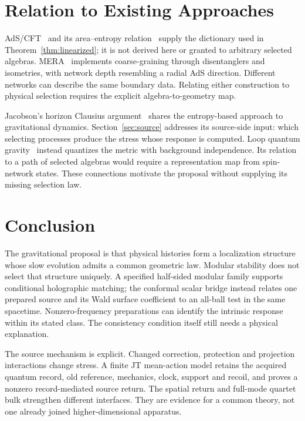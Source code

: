 \section{Relation to Existing Approaches}
\label{sec:relation}

AdS/CFT~\cite{Maldacena1999} and its area--entropy relation~\cite{RyuTakayanagi2006} supply the dictionary used in Theorem~\ref{thm:linearized}; it is not derived here or granted to arbitrary selected algebras. MERA~\cite{Vidal2008,Swingle2012} implements coarse-graining through disentanglers and isometries, with network depth resembling a radial AdS direction. Different networks can describe the same boundary data. Relating either construction to physical selection requires the explicit algebra-to-geometry map.

Jacobson's horizon Clausius argument~\cite{Jacobson1995} shares the entropy-based approach to gravitational dynamics. Section~\ref{sec:source} addresses its source-side input: which selecting processes produce the stress whose response is computed. Loop quantum gravity~\cite{Rovelli2004,Thiemann2007} instead quantizes the metric with background independence. Its relation to a path of selected algebras would require a representation map from spin-network states. These connections motivate the proposal without supplying its missing selection law.

\section{Conclusion}
\label{sec:conclusion}

The gravitational proposal is that physical histories form a localization
structure whose slow evolution admits a common geometric law.
Modular stability does not select that structure uniquely.
A specified half-sided modular family supports conditional holographic
matching; the conformal scalar bridge instead relates one prepared
source and its Wald surface coefficient to an all-ball test in the
same spacetime. Nonzero-frequency preparations can identify the
intrinsic response within its stated class. The consistency condition
itself still needs a physical explanation.

The source mechanism is explicit. Changed correction, protection and
projection interactions change stress. A finite JT mean-action model
retains the acquired quantum record, old reference, mechanics, clock,
support and recoil, and proves a nonzero record-mediated source return.
The spatial return and full-mode quartet bulk strengthen different
interfaces. They are evidence for a common theory, not one already
joined higher-dimensional apparatus.

